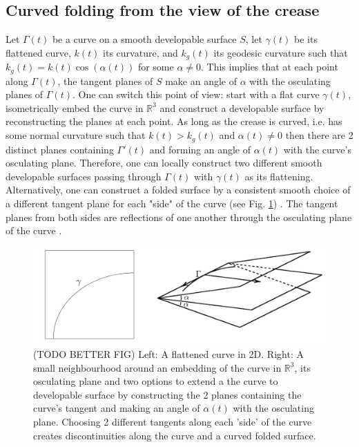 \subsection{Curved folding from the view of the crease} \label{sec:curved_folding_from_a_curve}
Let $\Gamma(t)$ be a curve on a smooth developable surface $S$,  let $\gamma(t)$ be its flattened curve, $k(t)$ its curvature, and $k_g(t)$ its geodesic curvature such that $k_g(t) = k(t) \cos(\alpha(t))$ for some $\alpha \neq 0$. This implies that at each point along $\Gamma(t)$, the tangent planes of $S$ make an angle of $\alpha$ with the osculating planes of $\Gamma(t)$. One can switch this point of view: start with a flat curve $\gamma(t)$, isometrically embed the curve in $\mathbb{R}^3$ and construct a developable surface by reconstructing the planes at each point. As long as the crease is curved, i.e. has some normal curvature such that $k(t) > k_g(t)$ and $\alpha(t) \neq 0$ then there are 2 distinct planes containing $\Gamma'(t)$ and forming an angle of $\alpha(t)$ with the curve's osculating plane. Therefore, one can locally construct two different smooth developable surfaces passing through $\Gamma(t)$ with $\gamma(t)$ as its flattening. Alternatively, one can construct a folded surface by a consistent smooth choice of a different tangent plane for each "side" of the curve (see Fig. \ref{fig:curved_fold_through_curve}) \cite{more_on_paper}. The tangent planes from both sides are reflections of one another through the osculating plane of the curve \cite{curved_folding_kilian}.

\begin{figure} [h]
	\centering
	\includegraphics[width=0.7\linewidth]{figures/curved_fold_through_curve.pdf}
	\caption{(TODO BETTER FIG) Left: A flattened curve in 2D. Right: A small neighbourhood around an embedding of the curve in $\mathbb{R}^3$, its osculating plane and two options to extend a the curve to developable surface by constructing the 2 planes containing the curve's tangent and making an angle of $\alpha(t)$  with the osculating plane. Choosing 2 different tangents along each 'side' of the curve creates discontinuities along the curve and a curved folded surface.}
	\label{fig:curved_fold_through_curve}
\end{figure}
